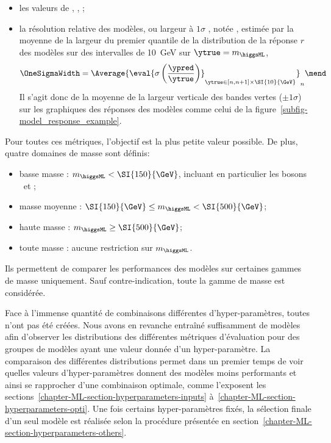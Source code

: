 \begin{itemize}
\item les valeurs de
\LossMSE,
\LossMAE,
\LossMAPE;
\item la résolution relative des modèles,
ou \og largeur à $1\sigma$ \fg,
notée \OneSigmaWidth,
estimée par
la moyenne
de
la largeur du premier quantile de la distribution de la réponse $r$ des modèles
sur des intervalles de \SI{10}{\GeV} sur $\ytrue=m_{\higgsML}$,
\ie
\begin{equation}
\OneSigmaWidth = \Average{\eval{\sigma\left(\frac{\ypred}{\ytrue}\right)}_{\ytrue\in [n, n+1]\times\SI{10}{\GeV}}}_n
\mend
\end{equation}
Il s'agit donc de la moyenne de la largeur verticale des bandes vertes ($\pm1\sigma$) sur les graphiques des réponses des modèles comme celui de la figure~\ref{subfig-model_response_example}.
\end{itemize}
Pour toutes ces métriques, l'objectif est la plus petite valeur possible.
De plus, quatre domaines de masse sont définis:
\begin{itemize}
\item basse masse : $m_{\higgsML} < \SI{150}{\GeV}$, incluant en particulier les bosons \Zboson\ et \higgs;
\item masse moyenne : $\SI{150}{\GeV} \leq m_{\higgsML} < \SI{500}{\GeV}$;
\item haute masse : $m_{\higgsML} \geq \SI{500}{\GeV}$;
\item toute masse : aucune restriction sur $m_{\higgsML}$.
\end{itemize}
Ils permettent de comparer les performances des modèles sur certaines gammes de masse uniquement.
Sauf contre-indication, toute la gamme de masse est considérée.
\par
Face à l'immense quantité de combinaisons différentes d'hyper-paramètres, toutes n'ont pas été créées.
Nous avons en revanche entraîné suffisamment de modèles afin d'observer les distributions des différentes métriques d'évaluation
pour des groupes de modèles ayant une valeur donnée d'un hyper-paramètre.
La comparaison des différentes distributions permet dans un premier temps de
voir quelles valeurs d'hyper-paramètres donnent des modèles moins performants
et ainsi se rapprocher d'une combinaison optimale,
comme l'exposent les sections~\ref{chapter-ML-section-hyperparameters-inputs} à~\ref{chapter-ML-section-hyperparameters-opti}.
Une fois certains hyper-paramètres fixés,
la sélection finale d'un seul modèle est réalisée selon la procédure
présentée en section~\ref{chapter-ML-section-hyperparameters-others}.
